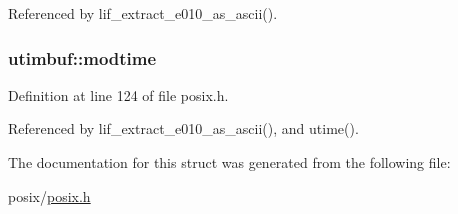 Referenced by lif\+\_\+extract\+\_\+e010\+\_\+as\+\_\+ascii().

\subsubsection[{\texorpdfstring{modtime}{modtime}}]{ utimbuf\+::modtime}\hypertarget{structutimbuf_a7588ffe699a9eda52e94aa593bf7d6d8}{}\label{structutimbuf_a7588ffe699a9eda52e94aa593bf7d6d8}


Definition at line 124 of file posix.\+h.



Referenced by lif\+\_\+extract\+\_\+e010\+\_\+as\+\_\+ascii(), and utime().



The documentation for this struct was generated from the following file\+:\begin{DoxyCompactItemize}
\item 
posix/\hyperlink{posix_8h}{posix.\+h}\end{DoxyCompactItemize}
